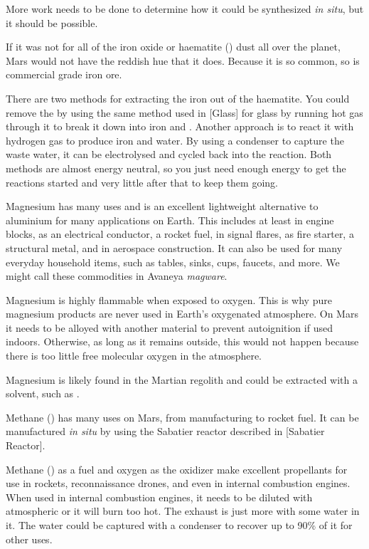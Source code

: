 More work needs to be done to determine how it could be synthesized {\it in situ}, but it should be possible.

If it was not for all of the iron oxide or haematite () dust all over the planet, Mars would not have the reddish hue that it does. Because it is so common, so is commercial grade iron ore. 

There are two methods for extracting the iron out of the haematite. You could remove the  by using the same method used in [Glass] for glass by running hot  gas through it to break it down into iron and . Another approach is to react it with hydrogen gas to produce iron and water. By using a condenser to capture the waste water, it can be electrolysed and cycled back into the reaction. Both methods are almost energy neutral, so you just need enough energy to get the reactions started and very little after that to keep them going.

Magnesium has many uses and is an excellent lightweight alternative to aluminium for many applications on Earth. This includes at least in engine blocks, as an electrical conductor, a rocket fuel, in signal flares, as fire starter, a structural metal, and in aerospace construction. It can also be used for many everyday household items, such as tables, sinks, cups, faucets, and more. We might call these commodities in Avaneya {\it magware}.

Magnesium is highly flammable when exposed to oxygen. This is why pure magnesium products are never used in Earth's oxygenated atmosphere. On Mars it needs to be alloyed with another material to prevent autoignition if used indoors. Otherwise, as long as it remains outside, this would not happen because there is too little free molecular oxygen in the atmosphere.

Magnesium is likely found in the Martian regolith and could be extracted with a solvent, such as .

Methane () has many uses on Mars, from manufacturing to rocket fuel. It can be manufactured {\it in situ} by using the Sabatier reactor described in [Sabatier Reactor].

Methane () as a fuel and oxygen as the oxidizer make excellent propellants for use in rockets, reconnaissance drones, and even in internal combustion engines. When used in internal combustion engines, it needs to be diluted with atmospheric  or it will burn too hot. The exhaust is just more  with some water in it. The water could be captured with a condenser to recover up to 90\% of it for other uses.

